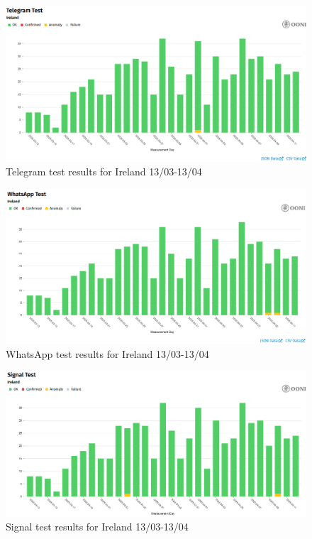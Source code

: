 \begin{figure} [H]
    \centering
    \includegraphics[width=0.5\linewidth]{IREOONIDBIMTL.png}
    \caption{Telegram test results for Ireland 13/03-13/04}
    \label{fig:enter-label}
\end{figure}

\begin{figure} [H]
    \centering
    \includegraphics[width=0.5\linewidth]{IREOONIDBIMWHATS.png}
    \caption{WhatsApp test results for Ireland 13/03-13/04}
    \label{fig:enter-label}
\end{figure}

\begin{figure} [H]
    \centering
    \includegraphics[width=0.5\linewidth]{IREOONIDBSIG.png}
    \caption{Signal test results for Ireland 13/03-13/04}
    \label{fig:enter-label}
\end{figure}



